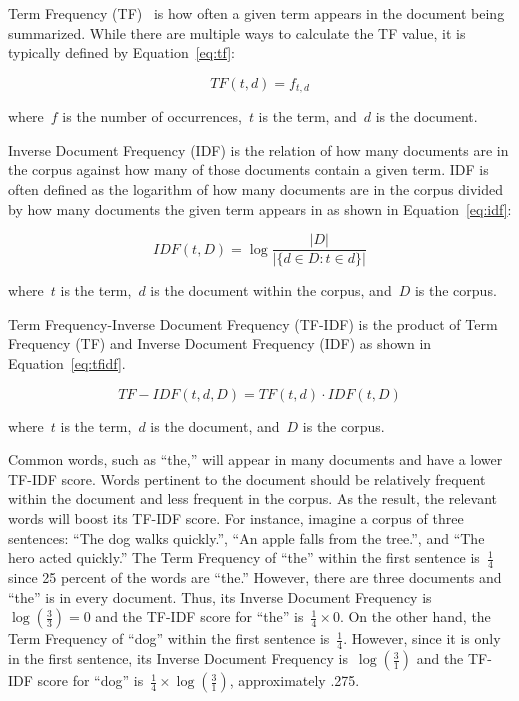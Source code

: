 \documentclass{article}[10]
\begin{document}
Term Frequency (TF)~\cite{Leskovec} is how often a given term appears in the
document being summarized. While there are multiple ways to calculate the TF
value, it is typically defined by Equation~\eqref{eq:tf}:

\begin{equation}
  TF(t, d) = f_{t, d} \label{eq:tf}
\end{equation}

where~\(f\) is the number of occurrences,~\(t\) is the term, and~\(d\) is the
document.

Inverse Document Frequency (IDF) is the relation of how many documents are in
the corpus against how many of those documents contain a given term. IDF is
often defined as the logarithm of how many documents are in the corpus divided
by how many documents the given term appears in as shown in
Equation~\eqref{eq:idf}:

\begin{equation}
  IDF(t, D) = \log\frac{|D|}{|\{d \in D : t \in d\}|} \label{eq:idf}
\end{equation}

where~\(t\) is the term,~\(d\) is the document within the corpus, and~\(D\) is
the corpus.

Term Frequency-Inverse Document Frequency (TF-IDF) is the product of Term
Frequency (TF) and Inverse Document Frequency (IDF) as shown in
Equation~\eqref{eq:tfidf}.

\begin{equation}
  TF-IDF(t, d, D) = TF(t, d) \cdot IDF(t, D) \label{eq:tfidf}
\end{equation}

where~\(t\) is the term,~\(d\) is the document, and~\(D\) is the corpus.

Common words, such as ``the,'' will appear in many documents and have a lower
TF-IDF score. Words pertinent to the document should be relatively frequent
within the document and less frequent in the corpus. As the result, the relevant
words will boost its TF-IDF score. For instance, imagine a corpus of three
sentences: ``The dog walks quickly.'', ``An apple falls from the tree.'', and
``The hero acted quickly.'' The Term Frequency of ``the'' within the first
sentence is~\(\frac{1}{4}\) since 25 percent of the words are ``the.'' However,
there are three documents and ``the'' is in every document. Thus, its Inverse
Document Frequency is~\( \log(\frac{3}{3}) = 0 \) and the TF-IDF score for
``the'' is~\(\frac{1}{4} \times 0\). On the other hand, the Term Frequency of
``dog'' within the first sentence is~\(\frac{1}{4}\). However, since it is only
in the first sentence, its Inverse Document Frequency is~\(\log(\frac{3}{1})\)
and the TF-IDF score for ``dog'' is~\(\frac{1}{4} \times \log(\frac{3}{1})\),
approximately .275.
\end{document}
